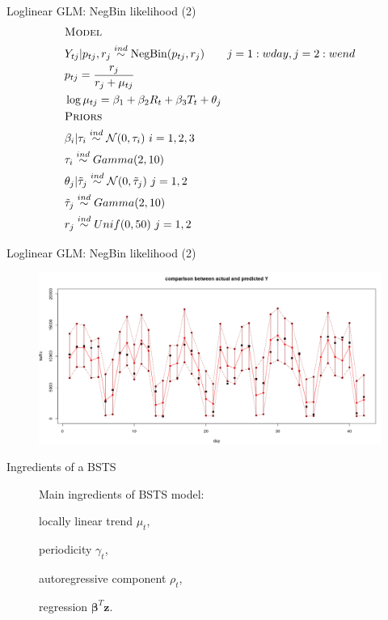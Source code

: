 \documentclass{beamer}
\begin{document}
\begin{frame}{Loglinear GLM: NegBin likelihood (2)}
\begin{equation*}
\begin{aligned}
&\textsc{Model}\\
&Y_{tj}  |  p_{tj},r_j \overset{ind}{\sim} \mathrm{NegBin}(p_{tj},r_j) \qquad j = 1: wday, j = 2: wend\\
&p_{tj} = \frac{r_j}{r_j + \mu_{tj}}\\
&\log{\mu_{tj}} = \beta_1 + \beta_2R_{t} + \beta_3T_{t} + \theta_j\\
&\textsc{Priors}\\
&\beta_i | \tau_i \overset{ind}{\sim} \mathcal{N}(0, \tau_i) \ i = 1,2,3\\
&\tau_i \overset{ind}{\sim} Gamma(2,10) \\
&\theta_j | \tilde{\tau}_j \overset{ind}{\sim} \mathcal{N}(0, \tilde{\tau}_j) \ j = 1,2\\
&\tilde{\tau}_j \overset{ind}{\sim} Gamma(2,10)\\
&r_j \overset{ind}{\sim} Unif(0,50) \ j = 1,2\\
\end{aligned}
\end{equation*}
\end{frame}

\begin{frame}{Loglinear GLM: NegBin likelihood (2)}
\begin{figure}[H]
\centering
\includegraphics[width=1\linewidth]{pictures/negbin_double_r_pred.png} 
\end{figure}
\end{frame}

\begin{frame}{Ingredients of a BSTS}
\begin{figure}[H]
	Main ingredients of \alert{BSTS} model:
	\begin{itemize}
		\item locally linear trend \alert{$ \mu_t $},
		{
		\item periodicity \alert{$ \gamma_t $},
		\item autoregressive component \alert{$ \rho_t $},
		\item regression \alert{$ \boldsymbol{\beta}^T\mathbf{z} $}.
		} 
	\end{itemize}
\end{figure}
\end{frame}
\end{document}
